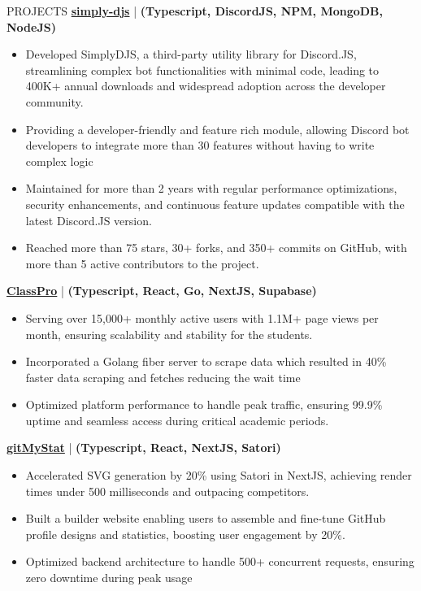 \documentclass{resume} %
\begin{document}
\begin{rSection}{PROJECTS}    
    \textbf{\href{https://github.com/Rahuletto/simply-djs}{simply-djs}} | \textbf{(Typescript, DiscordJS, NPM, MongoDB, NodeJS)}
\begin{itemize}
\itemsep -3pt{}
\item Developed SimplyDJS, a third-party utility library for Discord.JS, streamlining complex bot functionalities with minimal code, leading to 400K+ annual downloads and widespread adoption across the developer community.
\item Providing a developer-friendly and feature rich module, allowing Discord bot developers to integrate more than 30 features without having to write complex logic
\item Maintained for more than 2 years with regular performance optimizations, security enhancements, and continuous feature updates compatible with the latest Discord.JS version.
\item Reached more than 75 stars, 30+ forks, and 350+ commits on GitHub, with more than 5 active contributors to the project.
\end{itemize}
\textbf{\href{https://github.com/Rahuletto/ClassPro}{ClassPro}} | \textbf{(Typescript, React, Go, NextJS, Supabase)}
\begin{itemize}
\itemsep -3pt{}
\item Serving over 15,000+ monthly active users with 1.1M+ page views per month, ensuring scalability and stability for the students.
\item Incorporated a Golang fiber server to scrape data which resulted in 40\% faster data scraping and fetches reducing the wait time
\item Optimized platform performance to handle peak traffic, ensuring 99.9\% uptime and seamless access during critical academic periods.
\end{itemize}
\textbf{\href{https://github.com/Rahuletto/gitMyStat}{gitMyStat}} | \textbf{(Typescript, React, NextJS, Satori)}
\begin{itemize}
\itemsep -3pt{}
\item Accelerated SVG generation by 20\% using Satori in NextJS, achieving render times under 500 milliseconds and outpacing competitors.
\item Built a builder website enabling users to assemble and fine-tune GitHub profile designs and statistics, boosting user engagement by 20\%.
\item Optimized backend architecture to handle 500+ concurrent requests, ensuring zero downtime during peak usage
\end{itemize}
\end{rSection}
\end{document}

